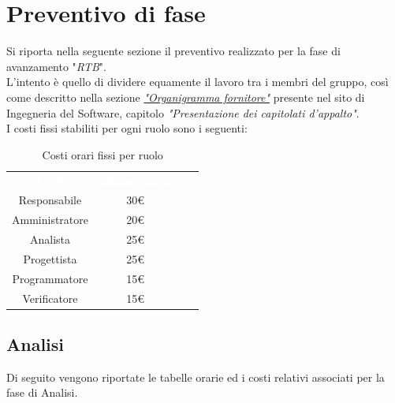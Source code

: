 \section{Preventivo di fase}
Si riporta nella seguente sezione il preventivo realizzato per la fase
di avanzamento "\textit{RTB}".\\
L'intento è quello di dividere equamente il lavoro tra i membri del gruppo,
così come descritto nella sezione \href{https://www.math.unipd.it/~tullio/IS-1/2021/Progetto/Capitolati.html}{\textit{"Organigramma fornitore"}}
presente nel sito di Ingegneria del Software, capitolo \textit{"Presentazione dei capitolati d'appalto"}.\\

\bigbreak
\noindent
I costi fissi stabiliti per ogni ruolo sono i seguenti:
\begin{table}[htb]
    \centering
    {\renewcommand{\arraystretch}{1.5}
    \begin{tabular}{cccc}
	    \rowcolor[RGB]{33, 73, 50}
	    \textcolor{white}{\textbf{Ruolo}} & \textcolor{white}{\textbf{Costo Orario}}\\
	    \rowcolor[RGB]{216, 235, 171}
	    Responsabile & 30\euro \\
	    \rowcolor[RGB]{233, 245, 206}
	    Amministratore & 20\euro\\
        \rowcolor[RGB]{216, 235, 171}
	    Analista & 25\euro\\
	    \rowcolor[RGB]{233, 245, 206}
	    Progettista & 25\euro\\
        \rowcolor[RGB]{216, 235, 171}
	    Programmatore & 15\euro\\
	    \rowcolor[RGB]{233, 245, 206}
	    Verificatore & 15\euro\\
    \end{tabular}	
}
\caption{Costi orari fissi per ruolo}
\end{table}

\subsection{Analisi}
Di seguito vengono riportate le tabelle orarie ed i costi relativi associati per la fase di Analisi.

\setlength\extrarowheight{5pt}

